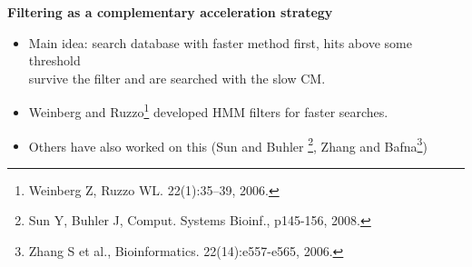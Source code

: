\documentclass[landscape]{slides}
\begin{document}
\begin{slide}

\begin{center}
\textbf{Filtering as a complementary acceleration strategy}
\end{center}

\small
\begin{itemize}
\item
  Main idea: search database with faster method first, hits above some threshold \\ survive the filter and are searched with the slow CM.
\item
  Weinberg and Ruzzo\footnote{Weinberg Z, Ruzzo WL. 22(1):35–39,
    2006.} developed HMM filters for faster searches.
\item
  Others have also worked on this (Sun and Buhler 
  \footnote{Sun Y, Buhler J, Comput. Systems
  Bioinf., p145-156, 2008.}, Zhang and Bafna\footnote{Zhang S et al.,
  Bioinformatics. 22(14):e557-e565, 2006.})
\end{itemize}

\vfill

\end{slide}
\end{document}
